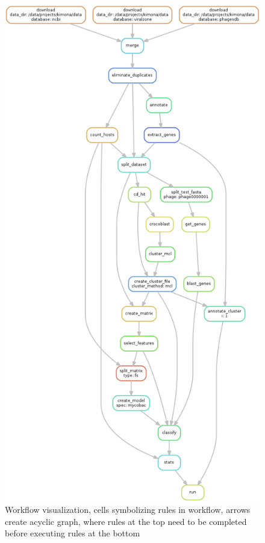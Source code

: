 \begin{figure}[h]
\includegraphics[height=0.9\textheight]{./images/mcl.png}
\centering
\caption{Workflow visualization, cells symbolizing rules in workflow, arrows create acyclic graph, where rules at the top need to be completed before executing rules at the bottom}
\label{fig:dag}
\end{figure}

